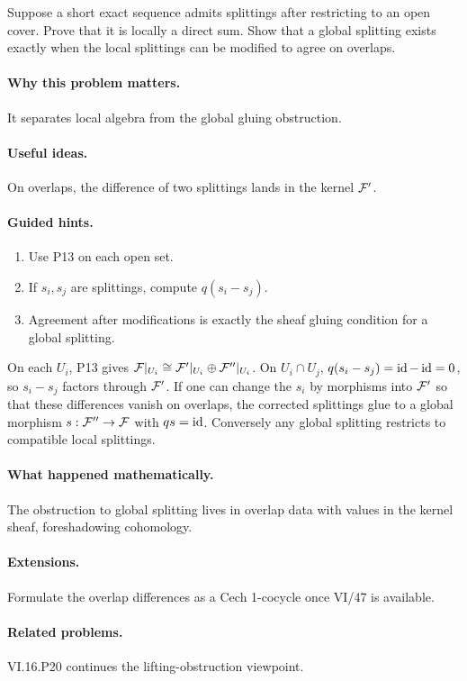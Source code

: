 \begin{problem}\label{prob:vi16-p19}
Suppose a short exact sequence admits splittings after restricting to an open cover.  Prove that it is locally a direct sum.  Show that a global splitting exists exactly when the local splittings can be modified to agree on overlaps.
\end{problem}

\ifdefined\FullProblemDossiers
\paragraph{Why this problem matters.}
It separates local algebra from the global gluing obstruction.

\paragraph{Useful ideas.}
On overlaps, the difference of two splittings lands in the kernel $\mathcal F'$.

\paragraph{Guided hints.}
\begin{enumerate}
\item Use P13 on each open set.
\item If $s_i,s_j$ are splittings, compute $q(s_i-s_j)$.
\item Agreement after modifications is exactly the sheaf gluing condition for a global splitting.
\end{enumerate}

\begin{solution}
On each $U_i$, P13 gives $\mathcal F|_{U_i}\cong\mathcal F'|_{U_i}\oplus\mathcal F''|_{U_i}$.  On $U_i\cap U_j$,
$q(s_i-s_j)=\operatorname{id}-\operatorname{id}=0$, so $s_i-s_j$ factors through $\mathcal F'$.  If one can change the $s_i$ by morphisms into $\mathcal F'$ so that these differences vanish on overlaps, the corrected splittings glue to a global morphism $s:\mathcal F''\to\mathcal F$ with $qs=\operatorname{id}$.  Conversely any global splitting restricts to compatible local splittings.
\end{solution}

\paragraph{What happened mathematically.}
The obstruction to global splitting lives in overlap data with values in the kernel sheaf, foreshadowing cohomology.

\paragraph{Extensions.}
Formulate the overlap differences as a Cech 1-cocycle once VI/47 is available.

\paragraph{Related problems.}
VI.16.P20 continues the lifting-obstruction viewpoint.
\fi
